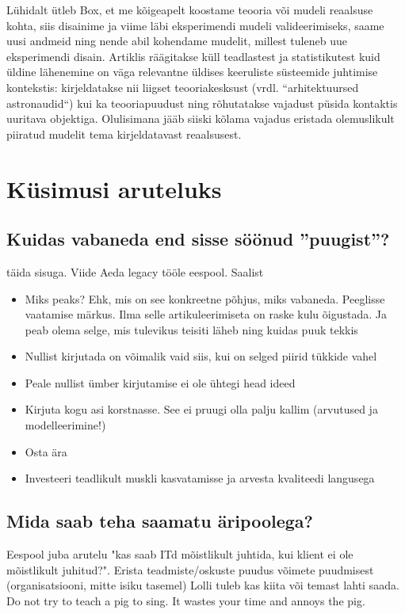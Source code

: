 Lühidalt ütleb Box, et me kõigeapelt koostame teooria või mudeli reaalsuse kohta, siis disainime ja viime läbi eksperimendi mudeli valideerimiseks, saame uusi andmeid ning nende abil kohendame mudelit, millest tuleneb uue eksperimendi disain. Artiklis räägitakse küll teadlastest ja statistikutest kuid üldine lähenemine on  väga relevantne üldises keeruliste süsteemide juhtimise kontekstis: kirjeldatakse nii liigset teooriakesksust (vrdl. ``arhitektuursed astronaudid``) kui ka teooriapuudust ning rõhutatakse vajadust püsida kontaktis uuritava objektiga. Olulisimana jääb siiski kõlama vajadus eristada olemuslikult piiratud mudelit tema kirjeldatavast reaalsusest.  

\section{Küsimusi aruteluks}
\subsection{Kuidas vabaneda end sisse söönud ”puugist”?}
\TODO täida sisuga. Viide Aeda legacy tööle eespool. 
Saalist
\begin{itemize}
	\item Miks peaks? Ehk, mis on see konkreetne põhjus, miks vabaneda. Peeglisse vaatamise märkus. Ilma selle artikuleerimiseta on raske kulu õigustada. Ja peab olema selge, mis tulevikus teisiti läheb ning kuidas puuk tekkis
	\item Nullist kirjutada on võimalik vaid siis, kui on selged piirid tükkide vahel
	\item Peale nullist ümber kirjutamise ei ole ühtegi head ideed
\end{itemize}

\begin{itemize}
	\item Kirjuta kogu asi korstnasse. See ei pruugi olla palju kallim (arvutused ja modelleerimine!)
	\item Osta ära
	\item Investeeri teadlikult muskli kasvatamisse ja arvesta kvaliteedi langusega
\end{itemize}

\subsection{Mida saab teha saamatu äripoolega?}
Eespool juba arutelu "kas saab ITd mõistlikult juhtida, kui klient ei ole mõistlikult juhitud?". Erista teadmiste/oskuste puudus võimete puudmisest (organisatsiooni, mitte isiku tasemel) Lolli tuleb kas kiita või temast lahti saada. Do not try to teach a pig to sing. It wastes your time and annoys the pig. 

